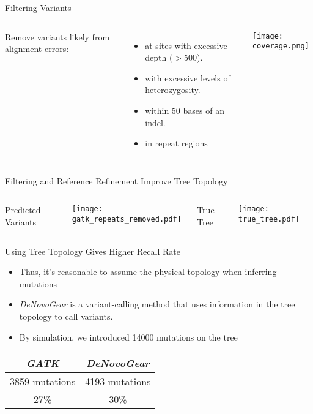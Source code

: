 \documentclass{beamer}
\begin{document}
\begin{frame}{Filtering Variants}
\begin{columns}
Remove variants likely from alignment errors:
\begin{itemize}
	\item at sites with excessive depth ($>$500).
	\item with excessive levels of heterozygosity.
	\item within 50 bases of an indel.
	\item in repeat regions 
\end{itemize}
\texttt{[image: coverage.png]}
\end{columns}
\end{frame}


\begin{frame}{ Filtering and Reference Refinement Improve Tree Topology}
	\begin{columns}
		\begin{center}
		Predicted Variants
		\end{center}
		\texttt{[image: gatk\_repeats\_removed.pdf]}
		\begin{center}
		True Tree
		\end{center}
		\texttt{[image: true\_tree.pdf]}
	\end{columns}
\end{frame}

\begin{frame}{Using Tree Topology Gives Higher Recall Rate}
	\begin{itemize}
	\item Thus, it's reasonable to assume the physical topology when inferring mutations
	\item \textit{DeNovoGear} is a variant-calling method that uses information in the tree topology to call variants.
	\item By simulation, we introduced 14000 mutations on the tree
	\end{itemize}
	\begin{center}
	\begin{tabular}{ c | c }
	\textit{GATK} & \textit{DeNovoGear} \\
	\hline
	3859 mutations & 4193 mutations \\
	27\% & 30\%
	\end{tabular}
	\end{center}
\end{frame}
\end{document}
